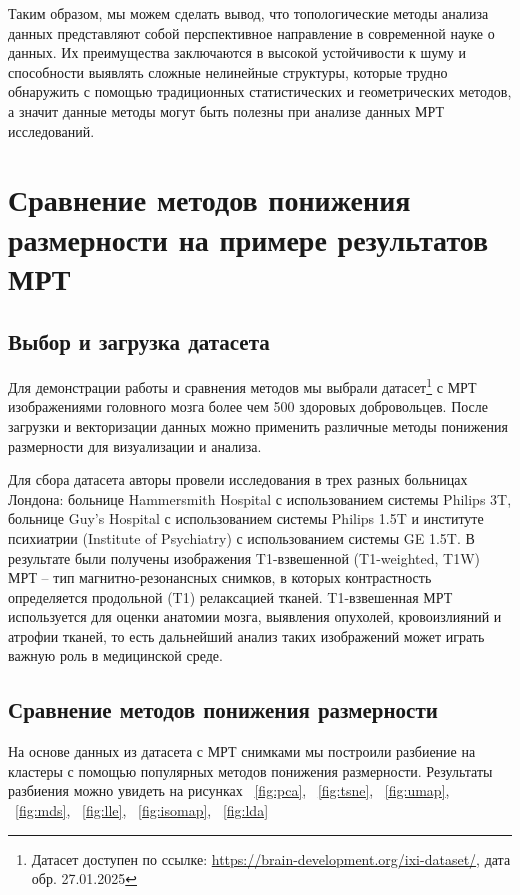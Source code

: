 \documentclass[a4paper,12pt]{extarticle}
\begin{document}
Таким образом, мы можем сделать вывод, что топологические методы анализа данных представляют собой перспективное направление в современной науке о данных. Их преимущества заключаются в высокой устойчивости к шуму и способности выявлять сложные нелинейные структуры, которые трудно обнаружить с помощью традиционных статистических и геометрических методов, а значит данные методы могут быть полезны при анализе данных МРТ исследований. 

\section{Сравнение методов понижения размерности на примере результатов МРТ}

\subsection{Выбор и загрузка датасета}

Для демонстрации работы и сравнения методов мы выбрали датасет\footnote{Датасет доступен по ссылке: \url{https://brain-development.org/ixi-dataset/}, дата обр. 27.01.2025} с МРТ изображениями головного мозга более чем 500 здоровых добровольцев. После загрузки и векторизации данных можно применить различные методы понижения размерности для визуализации и анализа. 

Для сбора датасета авторы провели исследования в трех разных больницах Лондона:
больнице Hammersmith Hospital с использованием системы Philips 3T, 
больнице Guy’s Hospital с использованием системы Philips 1.5T и
институте психиатрии (Institute of Psychiatry) с использованием системы GE 1.5T. В результате были получены изображения T1-взвешенной (T1-weighted, T1W) МРТ –  тип магнитно-резонансных снимков, в которых контрастность определяется продольной (T1) релаксацией тканей. T1-взвешенная МРТ используется для оценки анатомии мозга, выявления опухолей, кровоизлияний и атрофии тканей, то есть дальнейший анализ таких изображений может играть важную роль в медицинской среде. 

\subsection{Сравнение методов понижения размерности}

На основе данных из датасета с МРТ снимками мы построили разбиение на кластеры с помощью популярных методов понижения размерности. Результаты разбиения можно увидеть на рисунках ~\ref{fig:pca}, ~\ref{fig:tsne}, ~\ref{fig:umap}, ~\ref{fig:mds}, ~\ref{fig:lle}, ~\ref{fig:isomap}, ~\ref{fig:lda}
\end{document}
